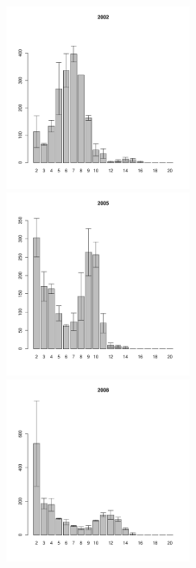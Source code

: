 \documentclass[12pt, a4paper]{article}
\begin{document}
\begin{figure}[h]
\begin{multicols}{3}
\hfill
\includegraphics[width=60mm]{../White_Sea/Estuatiy_Luvenga/sizestr2_2002_.pdf}
\hfill
\includegraphics[width=60mm]{../White_Sea/Estuatiy_Luvenga/sizestr2_2005_.pdf}
\hfill
\includegraphics[width=60mm]{../White_Sea/Estuatiy_Luvenga/sizestr2_2008_.pdf}
\end{multicols}




\end{figure}
\end{document}
